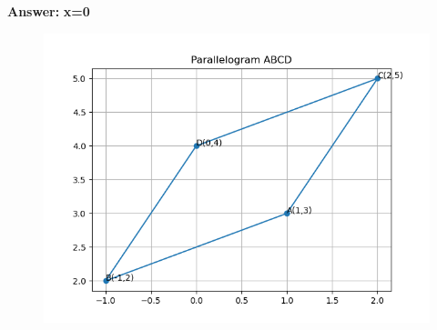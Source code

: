 \documentclass[journal]{IEEEtran}
\begin{document}
\textbf{Answer:}  
\textbf{x=0}

\begin{figure}[h!]
    \centering
    \includegraphics[height=0.5\textheight, keepaspectratio]{figs/plotc.png}
    \label{figure_1}
\end{figure}
\end{document}
